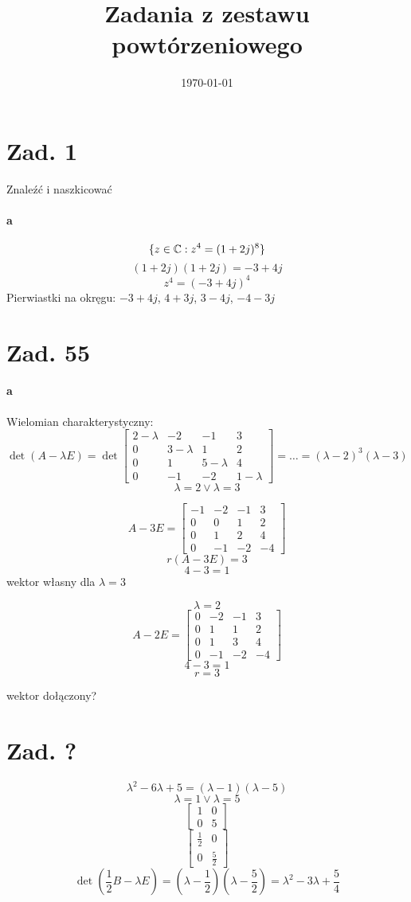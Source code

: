 \documentclass[a4paper,fleqn]{article}
\title{Zadania z zestawu powtórzeniowego}
\author{}
\date{\today}
\begin{document}
	\section*{Zad. 1}
	Znaleźć i naszkicować
	\paragraph{a}
	\[ \{ z\in\mathbb{C} : z^4 = (1+2j)^8 \} \]
	\[ (1+2j)(1+2j) = -3 + 4j \]
	\[ z^4 = (-3+4j)^4 \]
	Pierwiastki na okręgu: $-3+4j$, $4+3j$, $3-4j$, $-4-3j$
	\section*{Zad. 55}
	\paragraph{a}
	Wielomian charakterystyczny:
	\[ \det(A-\lambda E) = \det \begin{bmatrix}
		2-\lambda & -2 & -1 & 3\\
		0 & 3-\lambda & 1 &2 \\
		0&1 & 5-\lambda & 4 \\
		0 & -1 & -2 &  1-\lambda
		\end{bmatrix} = \ldots = (\lambda-2)^3 (\lambda-3) \]
	\[ \lambda =2 \lor \lambda = 3 \]

	\[ A-3E = \begin{bmatrix}
		-1 & -2 & -1 & 3 \\
		0&0&1&2\\
		0&1&2&4\\
		0&-1&-2&-4
		\end{bmatrix} \]
	\[ r(A-3E) = 3 \]
	\[ 4-3 = 1 \]
	wektor własny dla $\lambda = 3 $

	\[ \lambda = 2 \]
	\[ A-2E = \begin{bmatrix}
		0 & -2 & -1 & 3 \\
		0& 1 & 1 & 2 \\
		0 & 1 & 3 & 4 \\
		0 & -1 & -2 & -4
		\end{bmatrix}
		\]
	\[ 4 -3 = 1 \]
	\[ r = 3 \]

	wektor dołączony?

	\section*{Zad. ?}
	\[ \lambda^2 - 6\lambda + 5 = (\lambda-1)(\lambda-5) \]
	\[ \lambda = 1 \lor \lambda = 5 \]
	\[ \begin{bmatrix} 1& 0\\ 0& 5 \end{bmatrix} \]
	\[ \begin{bmatrix} \frac 1 2 & 0 \\ 0 & \frac 5 2 \end{bmatrix} \]
	\[ \det(\frac 1 2 B -\lambda E) = (\lambda-\frac 1 2)(\lambda-\frac 5 2) =
		 \lambda^2 - 3\lambda + \frac 5 4 \]
\end{document}

